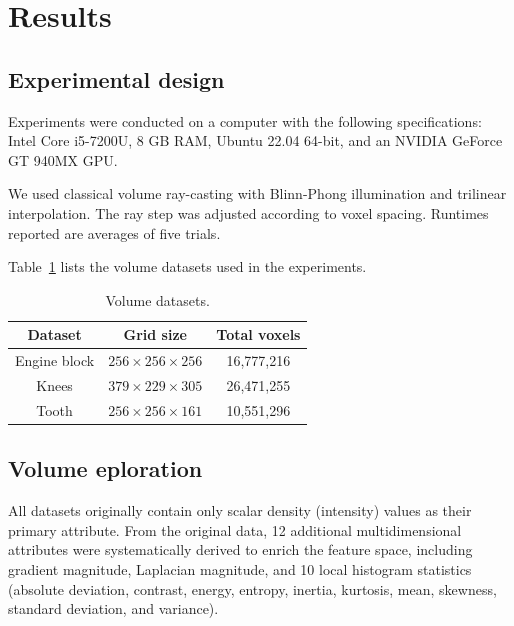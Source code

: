 \section{Results}
\label{sect:results}

\subsection{Experimental design}
\label{subsect:experimental-design}

Experiments were conducted on a computer with the following specifications: Intel Core i5-7200U, 8 GB RAM, Ubuntu 22.04 64-bit, and an NVIDIA GeForce GT 940MX GPU.

We used classical volume ray-casting with Blinn-Phong illumination and trilinear interpolation. The ray step was adjusted according to voxel spacing. Runtimes reported are averages of five trials.

Table~\ref{tab:datasets-descriptions} lists the volume datasets used in the experiments.

\begin{table}[htb!]
    \centering
    \caption{Volume datasets.}
    \begin{tabular}{@{}ccc@{}}
        \toprule
        \textbf{Dataset} & \textbf{Grid size} & \textbf{Total voxels} \\ 
        \midrule
        Engine block & $256 \times 256 \times 256$ & 16,777,216\\
        Knees & $379 \times 229 \times 305$ & 26,471,255\\
        Tooth & $256 \times 256 \times 161$ & 10,551,296\\
        \bottomrule
    \end{tabular}
    \label{tab:datasets-descriptions}
\end{table}


\subsection{Volume eploration}
\label{subsect:volume-exploration}

All datasets originally contain only scalar density (intensity) values as their primary attribute. From the original data, 12 additional multidimensional attributes were systematically derived to enrich the feature space, including gradient magnitude, Laplacian magnitude, and 10 local histogram statistics (absolute deviation, contrast, energy, entropy, inertia, kurtosis, mean, skewness, standard deviation, and variance).

